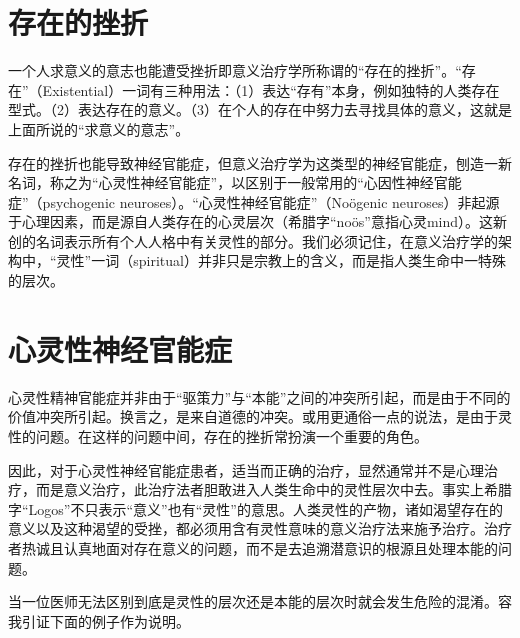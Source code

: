 \documentclass[11pt,oneside]{book}
\begin{document}
\begin{common-format}
\section{存在的挫折}
一个人求意义的意志也能遭受挫折即意义治疗学所称谓的“存在的挫折”。“存在”（Existential）一词有三种用法：（1）表达“存有”本身，例如独特的人类存在型式。（2）表达存在的意义。（3）在个人的存在中努力去寻找具体的意义，这就是上面所说的“求意义的意志”。

存在的挫折也能导致神经官能症，但意义治疗学为这类型的神经官能症，刨造一新名词，称之为“心灵性神经官能症”，以区别于一般常用的“心因性神经官能症”（psychogenic neuroses）。“心灵性神经官能症”（No\"ogenic neuroses）非起源于心理因素，而是源自人类存在的心灵层次（希腊字“no\"os”意指心灵mind）。这新创的名词表示所有个人人格中有关灵性的部分。我们必须记住，在意义治疗学的架构中，“灵性”一词（spiritual）并非只是宗教上的含义，而是指人类生命中一特殊的层次。


\section{心灵性神经官能症}
心灵性精神官能症并非由于“驱策力”与“本能”之间的冲突所引起，而是由于不同的价值冲突所引起。换言之，是来自道德的冲突。或用更通俗一点的说法，是由于灵性的问题。在这样的问题中间，存在的挫折常扮演一个重要的角色。

因此，对于心灵性神经官能症患者，适当而正确的治疗，显然通常并不是心理治疗，而是意义治疗，此治疗法者胆敢进入人类生命中的灵性层次中去。事实上希腊字“Logos”不只表示“意义”也有“灵性”的意思。人类灵性的产物，诸如渴望存在的意义以及这种渴望的受挫，都必须用含有灵性意味的意义治疗法来施予治疗。治疗者热诚且认真地面对存在意义的问题，而不是去追溯潜意识的根源且处理本能的问题。

当一位医师无法区别到底是灵性的层次还是本能的层次时就会发生危险的混淆。容我引证下面的例子作为说明。


\end{common-format}
\end{document}
